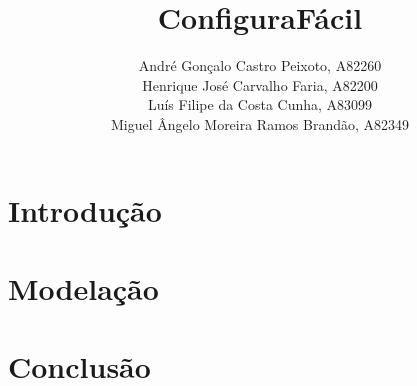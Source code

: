 \documentclass[a4paper, twoside]{report}
\title{ConfiguraFácil}
\author{André Gonçalo Castro Peixoto, A82260\\
        Henrique José Carvalho Faria, A82200\\
        Luís Filipe da Costa Cunha, A83099\\
        Miguel Ângelo Moreira Ramos Brandão, A82349}
\begin{document}


\tableofcontents


\chapter{Introdução}
    
    
\chapter{Modelação}
    
    
    
    
    
    

\chapter{Conclusão}
    
\end{document}
